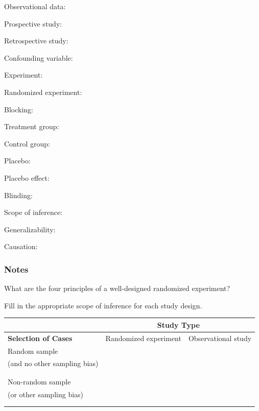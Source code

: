 \documentclass[
]{report}
\newcommand{\rgs}{\vspace{12pt}} %
\newcommand{\rgi}{\hspace{24pt}}  %
\begin{document}
\rgi Observational data:
\rgs

\rgi Prospective study:
\rgs

\rgi Retrospective study:
\rgs

Confounding variable:
\rgs

Experiment:
\rgs

\rgi Randomized experiment:
\rgs

\rgi Blocking:
\rgs

\rgi Treatment group:
\rgs

\rgi Control group:
\rgs

\rgi Placebo:
\rgs

\rgi Placebo effect:
\rgs

\rgi Blinding:
\rgs

Scope of inference:
\rgs

Generalizability:
\rgs

Causation:
\rgs

\hypertarget{notes-2}{%
\subsubsection*{Notes}\label{notes-2}}

What are the four principles of a well-designed randomized experiment?\\
\rgs
\rgs
\rgs

Fill in the appropriate scope of inference for each study design.

\begin{center}
\begin{tabular}{|p{2in}|p{2in}|p{2in}|}
\hline
 & \multicolumn{2}{|c|}{\textbf{Study Type}} \\ \hline
 \textbf{Selection of Cases} & Randomized experiment & Observational study \\ \hline
 Random sample && \\ 
 (and no other sampling bias) & & \\ 
  & & \\
   & & \\ \hline
   Non-random sample && \\ 
   (or other sampling bias) & & \\ 
  & & \\
   & & \\ \hline
\end{tabular}
\end{center}

\rgs
\end{document}
